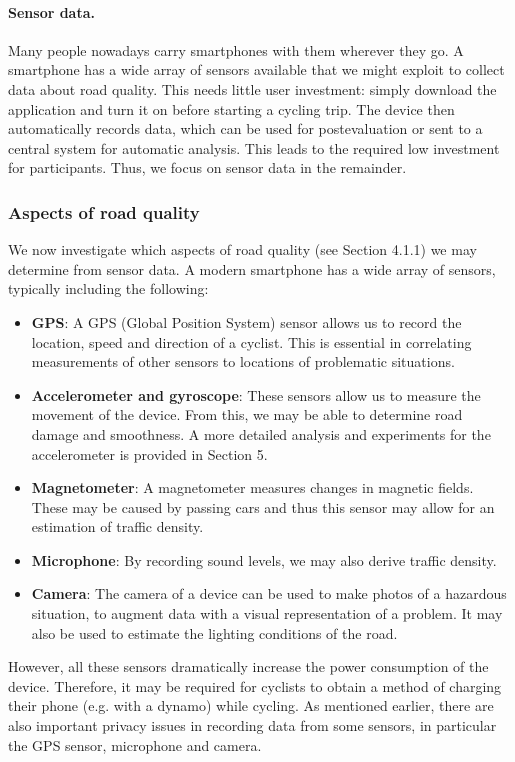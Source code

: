 \documentclass[a4paper,11pt]{article}
\begin{document}
\paragraph{Sensor data.}
Many people nowadays carry smartphones with them wherever they go. A smartphone has a wide array of sensors available that we might exploit to collect data about road quality. This needs little user investment: simply download the application and turn it on before starting a cycling trip. The device then automatically records data, which can be used for postevaluation or sent to a central system for automatic analysis. This leads to the required low investment for participants. Thus, we focus on sensor data in the remainder.

\subsubsection{Aspects of road quality}

We now investigate which aspects of road quality (see Section 4.1.1) we may determine from sensor data. A modern smartphone has a wide array of sensors, typically including the following:
\begin{itemize}\setlength{\itemsep}{-3pt}
\item \textbf{GPS}: A GPS (Global Position System) sensor allows us to record the location, speed and direction of a cyclist. This is essential in correlating measurements of other sensors to locations of problematic situations.
\item \textbf{Accelerometer and gyroscope}: These sensors allow us to measure the movement of the device. From this, we may be able to determine road damage and smoothness. A more detailed analysis and experiments for the accelerometer is provided in Section 5.
\item \textbf{Magnetometer}: A magnetometer measures changes in magnetic fields. These may be caused by passing cars and thus this sensor may allow for an estimation of traffic density.
\item \textbf{Microphone}: By recording sound levels, we may also derive traffic density.
\item \textbf{Camera}: The camera of a device can be used to make photos of a hazardous situation, to augment data with a visual representation of a problem. It may also be used to estimate the lighting conditions of the road.
\end{itemize}
However, all these sensors dramatically increase the power consumption of the device. Therefore, it may be required for cyclists to obtain a method of charging their phone (e.g. with a dynamo) while cycling. As mentioned earlier, there are also important privacy issues in recording data from some sensors, in particular the GPS sensor, microphone and camera.
\end{document}
